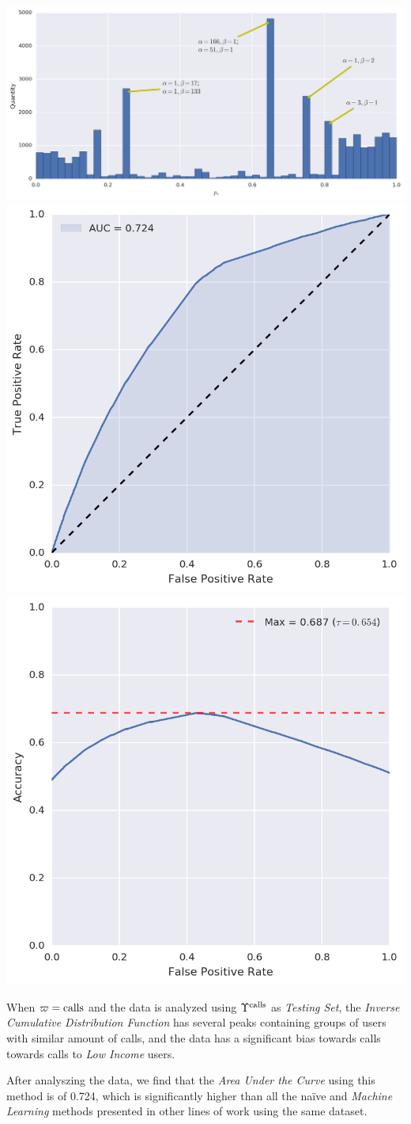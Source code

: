 \begin{center}
\includegraphics[width=\textwidth]{figures/bayes/hist_calls.png}
\includegraphics[width=.49\textwidth]{figures/bayes/roc_calls.png}
\includegraphics[width=.49\textwidth]{figures/bayes/accuracy_calls.png}
\end{center}

When $\varpi = \operatorname{calls}$ and the data is analyzed using $\Upsilon^{\operatorname{calls}}$ as \emph{Testing Set}, the \emph{Inverse Cumulative Distribution Function} has several peaks containing groups of users with similar amount of calls, and the data has a significant bias towards calls towards calls to \emph{Low Income} users.

After analyszing the data, we find that the \emph{Area Under the Curve} using this method is of \num{0.724}, which is significantly higher than all the naïve and \emph{Machine Learning} methods presented in other lines of work using the same dataset.

